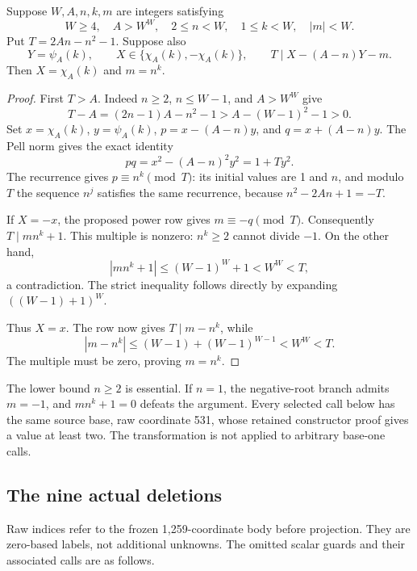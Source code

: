 \begin{lemma}\label{lem:signedpower}
Suppose \(W,A,n,k,m\) are integers satisfying
\[
W\ge4,\quad A>W^W,\quad 2\le n<W,\quad 1\le k<W,\quad |m|<W.
\]
Put \(T=2An-n^2-1\). Suppose also
\[
Y=\psi_A(k),\qquad X\in\{\chi_A(k),-\chi_A(k)\},\qquad
T\mid X-(A-n)Y-m.
\]
Then \(X=\chi_A(k)\) and \(m=n^k\).
\end{lemma}

\begin{proof}
First \(T>A\). Indeed \(n\ge2\), \(n\le W-1\), and \(A>W^W\) give
\[
T-A=(2n-1)A-n^2-1>A-(W-1)^2-1>0.
\]
Set \(x=\chi_A(k)\), \(y=\psi_A(k)\),
\(p=x-(A-n)y\), and \(q=x+(A-n)y\). The Pell norm gives the exact identity
\[
pq=x^2-(A-n)^2y^2=1+Ty^2.
\]
The recurrence gives \(p\equiv n^k\pmod T\): its initial values are 1 and \(n\), and modulo \(T\) the sequence \(n^j\) satisfies the same recurrence, because \(n^2-2An+1=-T\).

If \(X=-x\), the proposed power row gives \(m\equiv-q\pmod T\). Consequently \(T\mid mn^k+1\). This multiple is nonzero: \(n^k\ge2\) cannot divide \(-1\). On the other hand,
\[
|mn^k+1|\le(W-1)^W+1<W^W<T,
\]
a contradiction. The strict inequality follows directly by expanding \(((W-1)+1)^W\).

Thus \(X=x\). The row now gives \(T\mid m-n^k\), while
\[
|m-n^k|\le(W-1)+(W-1)^{W-1}<W^W<T.
\]
The multiple must be zero, proving \(m=n^k\).
\end{proof}

The lower bound \(n\ge2\) is essential. If \(n=1\), the negative-root branch admits \(m=-1\), and \(mn^k+1=0\) defeats the argument. Every selected call below has the same source base, raw coordinate 531, whose retained constructor proof gives a value at least two. The transformation is not applied to arbitrary base-one calls.

\subsection{The nine actual deletions}

Raw indices refer to the frozen 1,259-coordinate body before projection. They are zero-based labels, not additional unknowns. The omitted scalar guards and their associated calls are as follows.

